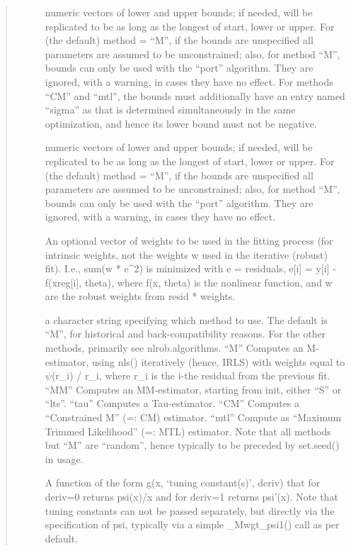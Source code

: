 \documentclass[letterpaper,10pt,english]{sphinxmanual}
\begin{document}
\begin{fulllineitems}
\begin{quote}
\begin{description}
\begin{description}
\item[{}] \leavevmode
numeric vectors of lower and upper bounds; if needed, will be
replicated to be as long as the longest of start, lower or upper. For
(the default) method = “M”, if the bounds are unspecified all
parameters are assumed to be unconstrained; also, for method “M”,
bounds can only be used with the “port” algorithm. They are ignored,
with a warning, in cases they have no effect.
For methods “CM” and “mtl”, the bounds must additionally have an entry
named “sigma” as that is determined simultaneously in the same
optimization, and hence its lower bound must not be negative.

\item[{}] \leavevmode
numeric vectors of lower and upper bounds; if needed, will be
replicated to be as long as the longest of start, lower or upper. For
(the default) method = “M”, if the bounds are unspecified all
parameters are assumed to be unconstrained; also, for method “M”,
bounds can only be used with the “port” algorithm. They are ignored,
with a warning, in cases they have no effect.

\item[{}] \leavevmode
An optional vector of weights to be used in the fitting process (for
intrinsic weights, not the weights w used in the iterative (robust)
fit). I.e., sum(w * e\textasciicircum{}2) is minimized with e = residuals,
e{[}i{]} = y{[}i{]} - f(xreg{[}i{]}, theta), where f(x, theta) is the nonlinear
function, and w are the robust weights from resid * weights.

\item[{}] \leavevmode
a character string specifying which method to use. The default is “M”, for historical and back-compatibility reasons. For the other methods, primarily see nlrob.algorithms.
“M”
Computes an M-estimator, using nls() iteratively (hence, IRLS) with weights equal to \(\psi\)(r\_i) / r\_i, where r\_i is the i-the residual from the previous fit.
“MM”
Computes an MM-estimator, starting from init, either “S” or “lts”.
“tau”
Computes a Tau-estimator.
“CM”
Computes a “Constrained M” (=: CM) estimator.
“mtl”
Compute as “Maximum Trimmed Likelihood” (=: MTL) estimator.
Note that all methods but “M” are “random”, hence typically to be preceded by set.seed() in usage.

\item[{}] \leavevmode
A function of the form g(x, ‘tuning constant(s)’, deriv) that for deriv=0 returns psi(x)/x and for deriv=1 returns psi’(x). Note that tuning constants can not be passed separately, but directly via the specification of psi, typically via a simple \_Mwgt\_psi1() call as per default.


\end{description}
\end{description}
\end{quote}
\end{fulllineitems}
\end{document}
